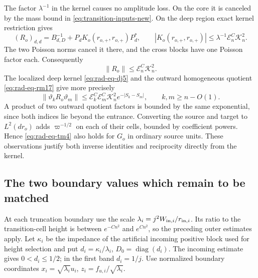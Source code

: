 The factor $\lambda^{-1}$ in the kernel causes no amplitude loss.
On the core it is canceled by the mass bound in
\eqref{eq:transition-inputs-new}.  On the deep region exact kernel
restriction gives
\[
 (R_o)_{d,d}=B_{d,D}^{-1}+P_dK_o(r_{o,+},r_{o,+})P_d^*,
 \qquad |K_o(r_{o,+},r_{o,+})|
        \le\lambda^{-1}\mathcal E_n^C\mathcal K_n^2.
\]
The two Poisson norms cancel it there, and the cross blocks have one
Poisson factor each.  Consequently
\begin{equation}\label{eq:rad-eq-tm3}
 \|R_o\|\le\mathcal E_n^C\mathcal K_n^2.
\end{equation}
The localized deep kernel \eqref{eq:rad-eq-dj5} and the outward
homogeneous quotient \eqref{eq:rad-eq-rm17} give more precisely
\begin{equation}\label{eq:rad-eq-tm4}
 \|\vartheta_kR_o\vartheta_m\|
 \le\mathcal E_k^C\mathcal E_m^C\mathcal K_n^2 e^{-|S_k-S_m|},
 \qquad k,m\ge n-O(1).
\end{equation}
A product of two outward quotient factors is bounded by the same
exponential, since both indices lie beyond the entrance.
Converting the source and target to $L^2(dr_o)$ adds
$\varpi^{-1/2}$ on each of their cells, bounded by coefficient powers.
Hence \eqref{eq:rad-eq-tm4} also holds for $G_o$ in ordinary source
units.  These observations justify both inverse identities and
reciprocity directly from the kernel.

\subsection{The two boundary values which remain to be matched}
\label{subsec:terminal-matching}

At each truncation boundary use the scale
$\lambda_i=j^2W_{{\rm in},i}/r_{{\rm in},i}$.
Its ratio to the transition-cell height is between $e^{-Cn^2}$ and
$e^{Cn^2}$, so the preceding outer estimates apply.
Let $\kappa_i$ be the impedance of the artificial incoming positive
block used for height selection and put
$d_i=\kappa_i/\lambda_i$, $D_0=\operatorname{diag}(d_i)$.
The incoming estimate gives $0<d_i\le1/2$; in the first band $d_i=1/j$.
Use normalized boundary coordinates
$x_i=\sqrt{\lambda_i}u_i$, $z_i=f_{u,i}/\sqrt{\lambda_i}$.

